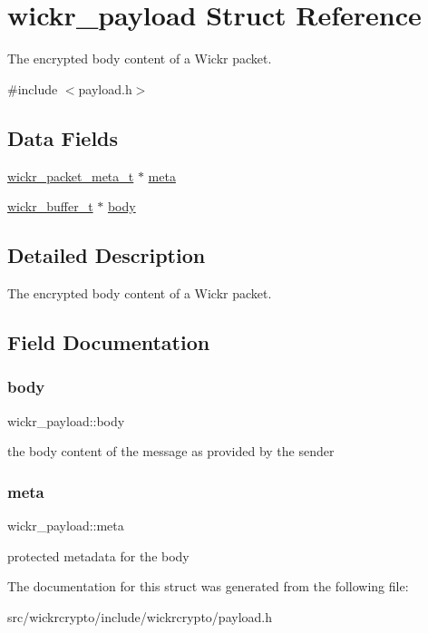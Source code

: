 \hypertarget{structwickr__payload}{}\section{wickr\+\_\+payload Struct Reference}
\label{structwickr__payload}


The encrypted body content of a Wickr packet.  




{\ttfamily \#include $<$payload.\+h$>$}

\subsection*{Data Fields}
\begin{DoxyCompactItemize}
\item 
\mbox{\hyperlink{structwickr__packet__meta}{wickr\+\_\+packet\+\_\+meta\+\_\+t}} $\ast$ \mbox{\hyperlink{structwickr__payload_a7df63984a660a0c09c166d60b213213f}{meta}}
\item 
\mbox{\hyperlink{structwickr__buffer}{wickr\+\_\+buffer\+\_\+t}} $\ast$ \mbox{\hyperlink{structwickr__payload_a6ef1b92ffd07c37b86202b4cc88a0522}{body}}
\end{DoxyCompactItemize}


\subsection{Detailed Description}
The encrypted body content of a Wickr packet. 

\subsection{Field Documentation}
\mbox{\label{structwickr__payload_a6ef1b92ffd07c37b86202b4cc88a0522}} 
\subsubsection{\texorpdfstring{body}{body}}
{\footnotesize\ttfamily wickr\+\_\+payload\+::body}

the body content of the message as provided by the sender \mbox{\label{structwickr__payload_a7df63984a660a0c09c166d60b213213f}} 
\subsubsection{\texorpdfstring{meta}{meta}}
{\footnotesize\ttfamily wickr\+\_\+payload\+::meta}

protected metadata for the body 

The documentation for this struct was generated from the following file\+:\begin{DoxyCompactItemize}
\item 
src/wickrcrypto/include/wickrcrypto/payload.\+h\end{DoxyCompactItemize}
